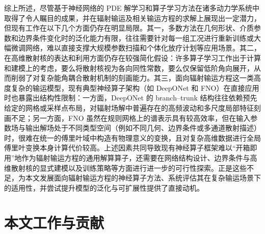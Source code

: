 综上所述，尽管基于神经网络的 PDE 解学习和算子学习方法在诸多动力学系统中取得了令人瞩目的成果，并在辐射输运及相关输运方程的求解上展现出一定潜力，但现有工作在以下几个方面仍存在明显局限。其一，多数方法在几何形状、介质参数和边界条件变化时的泛化能力有限，往往需要针对每一组工况进行重新训练或大幅微调网络，难以直接支撑大规模参数扫描和个体化放疗计划等应用场景。其二，在高维散射核的表达和利用方面仍存在较强简化假设：许多算子学习工作出于计算和建模上的考虑，要么将散射核视为各向同性常数，要么仅保留低阶角向展开，从而削弱了对复杂能角耦合散射机制的刻画能力。其三，面向辐射输运方程这一类高度复杂的输运模型，现有典型神经算子架构（如 DeepONet 和 FNO）在直接应用时也暴露出结构性限制：一方面，DeepONet 的 branch–trunk 结构往往依赖预先给定的网格或采样点布局，对辐射场解中普遍存在的高频波动和多尺度局部特征刻画不足；另一方面，FNO 虽然在规则网格上的谱表示具有较高效率，但在输入参数场与输出解场处于不同类型空间（例如不同几何、边界条件或多通道散射描述）时，很难在统一的傅里叶域中构造有物理意义的变换，且对复杂高维数据进行全局傅里叶变换本身计算代价较高。上述因素共同导致现有神经算子框架难以“开箱即用”地作为辐射输运方程的通用解算算子，还需要在网络结构设计、边界条件与高维散射核的显式建模以及训练策略等方面进行进一步的可行性探索。正是这些不足，为本文发展面向辐射输运方程的神经算子方法、系统评估其在复杂输运场景下的适用性，并尝试提升模型的泛化与可扩展性提供了直接动机。

\section{本文工作与贡献}

